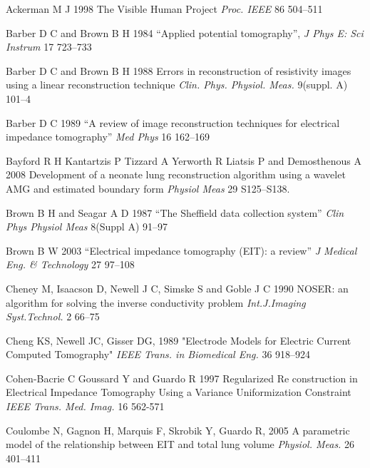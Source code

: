 \documentclass[12pt]{iopart}
\begin{document}
\item[]
Ackerman M J  1998  
The Visible Human Project
{\em Proc. IEEE}
86 504--511


%

\item[]
Barber D C and Brown B H 1984
``Applied potential tomography'', 
{\em J Phys E: Sci Instrum}
 17 723--733

\item[]
Barber D C and Brown B H 1988 Errors in reconstruction of
resistivity images using a linear reconstruction technique {\em
Clin. Phys. Physiol. Meas.} 
9(suppl. A) 101--4

\item[]
Barber D C 1989
``A review of image reconstruction techniques for electrical
 impedance tomography''
{\em Med Phys}
16 162--169

\item[]
Bayford R H Kantartzis P Tizzard A Yerworth R Liatsis P and Demosthenous A
 2008
Development of a neonate lung reconstruction algorithm using a wavelet
 AMG and estimated boundary form
{\em  Physiol Meas} 29 S125--S138.


\item[]
Brown B H and Seagar A D 1987 
``The Sheffield data collection system''
{\em Clin Phys Physiol Meas}
 8(Suppl A) 91--97

\item[]
Brown B W 2003
``Electrical impedance tomography (EIT): a review''
{\em J Medical Eng. \& Technology}
27 97--108


\item[]
Cheney M, Isaacson D, Newell J C, Simske S and Goble J C 1990
NOSER: an algorithm for solving the inverse conductivity problem
{\em Int.J.Imaging Syst.Technol.} 
2 66--75

\item[]
Cheng KS, Newell JC, Gisser DG, 1989
"Electrode Models for Electric Current Computed Tomography"
{\em IEEE Trans. in Biomedical Eng.}
36 918--924


\item[]
Cohen-Bacrie C  Goussard Y and Guardo R
1997
Regularized Re construction in Electrical
Impedance Tomography Using a Variance
Uniformization Constraint 
{\em IEEE Trans. Med. Imag.} 16 562-571

\item[]
Coulombe N, Gagnon H, Marquis F, Skrobik Y, Guardo R, 2005
A parametric model of the relationship between EIT and total lung volume
{\em Physiol. Meas.}
26 401--411
\end{document}
